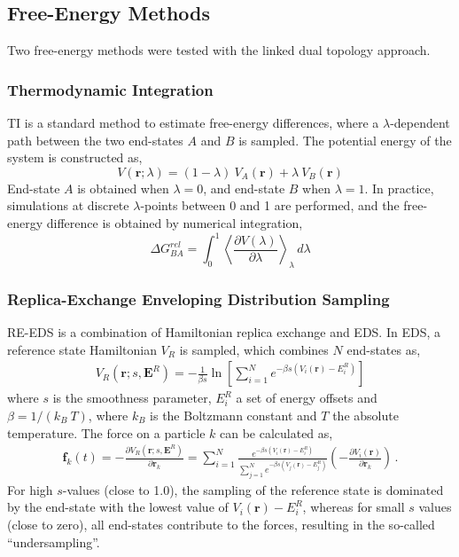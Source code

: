 \subsection{Free-Energy Methods}
Two free-energy methods were tested with the linked dual topology approach.

\subsubsection{Thermodynamic Integration}
TI is a standard method to estimate free-energy differences,\cite{Kirkwood1935} where a $\lambda$-dependent path between the two end-states $A$ and $B$ is sampled. The potential energy of the system is constructed as,
\begin{equation}
    V(\textbf{r}; \lambda) = (1-\lambda) ~ V_A(\textbf{r}) + \lambda ~ V_B(\textbf{r})
    \label{eq: TI-Potential}
\end{equation}
End-state $A$ is obtained when $\lambda = 0$, and end-state $B$ when $\lambda = 1$. In practice, simulations at discrete $\lambda$-points between 0 and 1 are performed, and the free-energy difference is obtained by numerical integration,
\begin{equation}
    \Delta G^{rel}_{BA} = \int^{1}_{0} \left< \frac{\partial V(\lambda)}{\partial \lambda} \right>_{\lambda} \,d\lambda
    \label{eq: TI-Integration}
\end{equation}

\subsubsection{Replica-Exchange Enveloping Distribution Sampling}
RE-EDS\cite{Sidler2016,Sidler2017,Ries2021B} is a combination of Hamiltonian replica exchange\cite{Hansmann1997,Sugita2000} and EDS.\cite{Christ2007,Christ2008} In EDS, a reference state Hamiltonian $V_R$ is sampled, which combines $N$ end-states as,
\begin{align}
    V_R\left(\textbf{r};s,\textbf{E}^R\right) = -\frac{1}{\beta s}\ln\left[\sum\limits_{i=1}^N e^{-\beta s\left(V_i(\textbf{r})-E_i^R\right)}\right]
\end{align}
where $s$ is the smoothness parameter, $E_i^R$ a set of energy offsets and $\beta=1/(k_B~T)$, where $k_B$ is the Boltzmann constant and $T$ the absolute temperature. 
The force on a particle $k$ can be calculated as, \cite{Christ2007,Christ2008}
\begin{align}
    \textbf{f}_k(t)=-\frac{\partial V_R(\textbf{r}; s, \textbf{E}^R)}{\partial \textbf{r}_k} = \sum^N_{i=1}\frac{e^{-\beta s(V_i(\textbf{r}) -E_i^R)}}{\sum^N_{j=1}{e^{-\beta s (V_j(\textbf{r})-E_j^R)}}}  \left( -\frac{\partial V_i(\textbf{r})}{\partial \textbf{r}_k} \right) \,.
\end{align}
For high $s$-values (close to 1.0), the sampling of the reference state is dominated by the end-state with the lowest value of $V_i(\textbf{r}) - E_i^R$, whereas for small $s$ values (close to zero), all end-states contribute to the forces, resulting in the so-called ``undersampling''.\cite{Riniker2011} 

